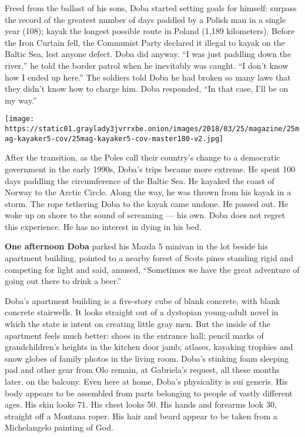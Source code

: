 Freed from the ballast of his sons, Doba started setting goals for
himself: surpass the record of the greatest number of days paddled by a
Polish man in a single year (108); kayak the longest possible route in
Poland (1,189 kilometers). Before the Iron Curtain fell, the Communist
Party declared it illegal to kayak on the Baltic Sea, lest anyone
defect. Doba did anyway. ``I was just paddling down the river,'' he told
the border patrol when he inevitably was caught. ``I don't know how I
ended up here.'' The soldiers told Doba he had broken so many laws that
they didn't know how to charge him. Doba responded, ``In that case, I'll
be on my way.''

\texttt{[image: https://static01.graylady3jvrrxbe.onion/images/2018/03/25/magazine/25mag-kayaker5-cov/25mag-kayaker5-cov-master180-v2.jpg]}

After the transition, as the Poles call their country's change to a
democratic government in the early 1990s, Doba's trips became more
extreme. He spent 100 days paddling the circumference of the Baltic Sea.
He kayaked the coast of Norway to the Arctic Circle. Along the way, he
was thrown from his kayak in a storm. The rope tethering Doba to the
kayak came undone. He passed out. He woke up on shore to the sound of
screaming --- his own. Doba does not regret this experience. He has no
interest in dying in his bed.

\textbf{One afternoon Doba} parked his Mazda 5 minivan in the lot beside
his apartment building, pointed to a nearby forest of Scots pines
standing rigid and competing for light and said, amused, ``Sometimes we
have the great adventure of going out there to drink a beer.''

Doba's apartment building is a five-story cube of blank concrete, with
blank concrete stairwells. It looks straight out of a dystopian
young-adult novel in which the state is intent on creating little gray
men. But the inside of the apartment feels much better: shoes in the
entrance hall; pencil marks of grandchildren's heights in the kitchen
door jamb; atlases, kayaking trophies and snow globes of family photos
in the living room. Doba's stinking foam sleeping pad and other gear
from Olo remain, at Gabriela's request, all these months later, on the
balcony. Even here at home, Doba's physicality is sui generis. His body
appears to be assembled from parts belonging to people of vastly
different ages. His skin looks 71. His chest looks 50. His hands and
forearms look 30, straight off a Montana roper. His hair and beard
appear to be taken from a Michelangelo painting of God.

